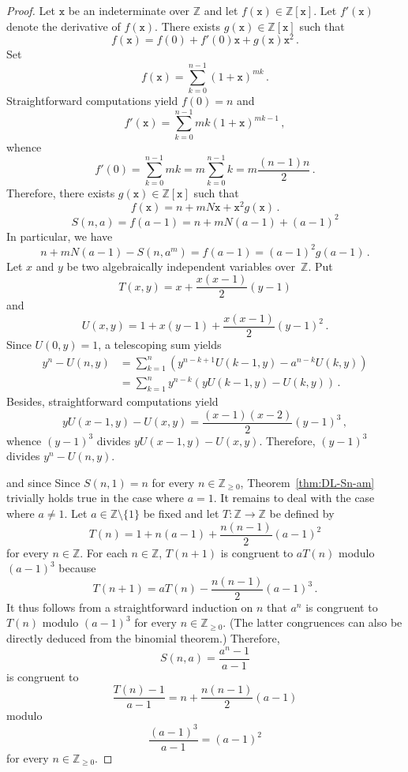 \documentclass[12pt]{article}
\newcommand{\bZ}{\mathbb{Z}}
\newcommand{\ttx}{\mathtt{x}}
\newcommand{\bN}{\bZ_{\ge 0}}%
\theoremstyle{definition}
\begin{document}
 \begin{proof}
   
   Let $\ttx$ be an indeterminate over $\bZ$ and let $f(\ttx) \in \bZ[\ttx]$.
   Let $f'(\ttx)$ denote the derivative of $f(\ttx)$.
   There exists $g(\ttx) \in \bZ[\ttx]$ such that
   $$
   f(\ttx) = f(0) + f'(0) \ttx + g(\ttx) \ttx^2 \, . 
   $$
   Set 
   $$
   f(\ttx) =  \sum_{k = 0}^{n - 1} {(1 + \ttx)}^{m k} \, .
   $$
   Straightforward computations yield $f(0) = n$ and 
   $$
   f'(\ttx) =  \sum_{k = 0}^{n - 1} m k  {(1 + \ttx)}^{m k - 1} \,,
   $$
   whence
   $$
   f'(0) = \sum_{k = 0}^{n - 1} m k =  m  \sum_{k = 0}^{n - 1} k  = m \frac{(n - 1)n}{2}  \, .
   $$
   Therefore,
   there exists $g(\ttx) \in \bZ[\ttx]$ such that
   $$f(\ttx) = n + mN \ttx + \ttx^2 g(\ttx) \, .$$
   $$
   S(n, a) = f(a - 1) = n + m N (a - 1) + {(a - 1)}^2 
   $$
   In particular, we have
   $$
   n + m N (a - 1) - S(n, a^m) = f(a - 1) =  {(a - 1)}^2 g(a - 1) \, . 
   $$
   Let $x$ and $y$ be two algebraically independent variables over~$\bZ$.
   Put 
   $$
   T(x, y) = x + \frac{x(x - 1)}{2} (y - 1)
   $$
   and
   $$
   U(x, y) = 1 + x (y - 1) + \frac{x(x - 1)}{2} {(y - 1)}^2 \, . 
   $$
   Since $U(0, y) = 1$, a telescoping sum yields
   \begin{align*}
     y^n - U(n, y)
     & = \sum_{k = 1}^{n} \left( y^{n - k + 1} U(k - 1, y) - a^{n - k} U(k, y)  \right) \\
     & = \sum_{k = 1}^n y^{n - k} \left( y U(k - 1, y) - U(k, y)  \right) \, .  
   \end{align*}
   Besides, straightforward computations yield
   $$
   y U(x - 1, y) - U(x, y) = \frac{(x - 1)(x - 2)}{2} {(y - 1)}^3 \,,
   $$
   whence ${(y - 1)}^3$ divides $y U(x - 1, y) - U(x, y)$.
   Therefore, ${(y - 1)}^3$ divides $y^n - U(n, y)$.
   
    and since 
   Since $S(n, 1) = n$ for every $n \in \bN$,
   Theorem~\ref{thm:DL-Sn-am} trivially holds true in the case where $a = 1$.
   It remains to deal with the case where $a \ne 1$.
   Let $a \in \bZ \setminus \{ 1 \}$ be fixed and let $T\colon \bZ \to \bZ$ be defined by
   $$
   T(n) =  1 + n (a - 1) + \frac{n(n - 1)}{2} {(a - 1)}^2 
   $$
   for every $n \in \bZ$.
   For each $n \in \bZ$,
   $T(n + 1)$ is congruent to $a T(n)$ modulo ${(a - 1)}^3$ because 
   $$
   T(n + 1) = a T(n) - \frac{n(n - 1)}{2} {(a - 1)}^3 \,.
   $$
   It thus follows from a straightforward induction on $n$ that
   $a^n$ is congruent to $T(n)$ modulo ${(a - 1)}^3$ for every $n \in \bN$.
   (The latter congruences can also be directly deduced from the binomial theorem.)
   Therefore,
   $$S(n, a) = \frac{a^n - 1}{a - 1} %
   $$
   is congruent to
   $$
   \frac{T(n) - 1}{a - 1} = n + \frac{n(n - 1)}{2}  {(a - 1)} 
   $$
   modulo
   $$
   \frac{{(a - 1)}^3}{a - 1} = {(a - 1)}^2
   $$
   for every $n \in \bN$.
 \end{proof}
\end{document}
